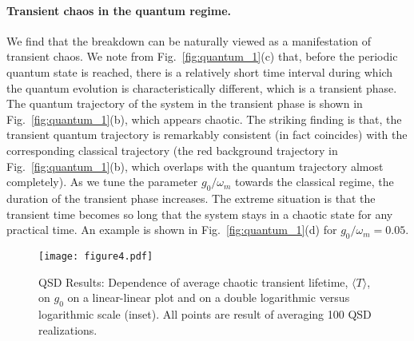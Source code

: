 \documentclass[12pt]{wlscirep}
\begin{document}
\paragraph*{Transient chaos in the quantum regime.}
We find that the breakdown can be naturally viewed as a manifestation 
of transient chaos. We note from Fig.~\ref{fig:quantum_1}(c) that, before 
the periodic quantum state is reached, there is a relatively short time 
interval during which the quantum evolution is characteristically different, 
which is a transient phase. The quantum trajectory of the system in the 
transient phase is shown in Fig.~\ref{fig:quantum_1}(b), which appears chaotic. 
The striking finding is that, the transient quantum trajectory is remarkably 
consistent (in fact coincides) with the corresponding classical trajectory 
(the red background trajectory in Fig.~\ref{fig:quantum_1}(b), which 
overlaps with the quantum trajectory almost completely). As we tune the 
parameter $g_0/\omega_m$ towards the classical regime, the duration of the 
transient phase increases. The extreme situation is that the transient
time becomes so long that the system stays in a chaotic state for any 
practical time. An example is shown in Fig.~\ref{fig:quantum_1}(d) 
for $g_0/\omega_m = 0.05$. 


\begin{figure}
\centering
\texttt{[image: figure4.pdf]}
\caption{QSD Results: Dependence of average chaotic transient lifetime,
$\langle T\rangle$, on $g_0$ on a linear-linear plot and on a double
logarithmic versus logarithmic scale (inset). All points are result of
averaging 100 QSD realizations.}
\label{fig:scaling}
\end{figure}
\end{document}
